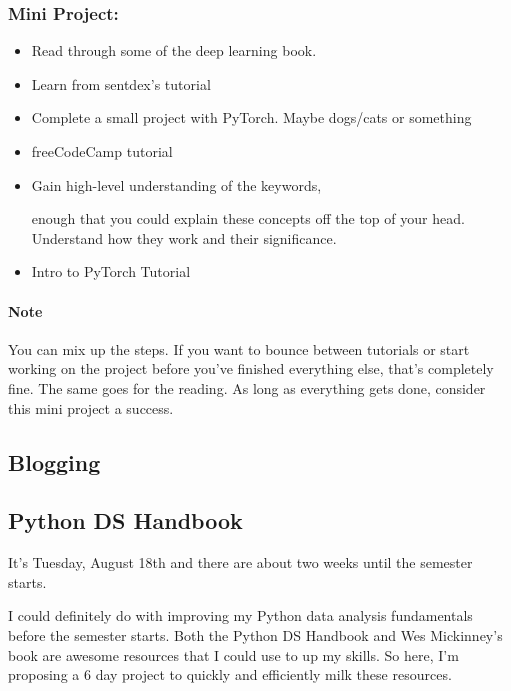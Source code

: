 \subsubsection*{Mini Project:}
\begin{itemize}
	\item
	Read through some of the deep learning book.

	\item
	Learn from sentdex's tutorial

	\item
	Complete a small project with PyTorch. Maybe dogs/cats or something

	\item
	freeCodeCamp tutorial

	\item
	Gain high-level understanding of the keywords,

	enough that you could explain these concepts off the top of your head. Understand how they work and their significance.

	\item
	Intro to PyTorch Tutorial
\end{itemize}

\paragraph*{Note}
You can mix up the steps. If you want to bounce between tutorials or start working on the project before you've finished everything else, that's completely fine. The same goes for the reading. As long as everything gets done, consider this mini project a success.


\subsection{Blogging}

\subsection{Python DS Handbook}

It's Tuesday, August 18th and there are about two weeks until the semester starts.

I could definitely do with improving my Python data analysis fundamentals  before the semester starts. Both the Python DS Handbook and Wes Mickinney's book are awesome resources that I could use to up my skills. So here, I'm proposing a 6 day project to quickly and efficiently milk these resources.

